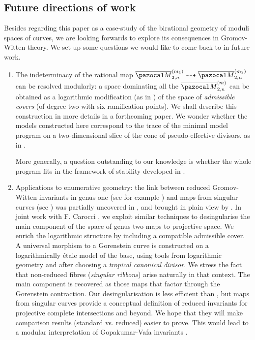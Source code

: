 \documentclass{compositio}
\newcommand{\oM}{\overline{\pazocal M}}
\theoremstyle{plain}
\theoremstyle{definition}
\theoremstyle{remark}
\begin{document}
\subsection{Future directions of work} Besides regarding this paper as a case-study of the birational geometry of moduli spaces of curves, we are looking forwards to explore its consequences in Gromov-Witten theory. We set up some questions we would like to come back to in future work.
\begin{enumerate}[leftmargin=.7cm]
 \item The indeterminacy of the rational map $\oM_{2,n}^{(m_1)}\dashrightarrow\oM_{2,n}^{(m_2)}$ can be resolved modularly: a space dominating all the $\oM_{2,n}^{(m)}$ can be obtained as a logarithmic modification (as in \cite{RSPW1}) of the space of \emph{admissible covers} (of degree two with six ramification points). We shall describe this construction in more details in a forthcoming paper. We wonder whether the models constructed here correspond to the trace of the minimal model program on a two-dimensional slice of the cone of pseudo-effective divisors, as in \cite{SMY2}.
 
 More generally, a question outstanding to our knowledge is whether the whole program fits in the framework of stability developed in \cite{DHLinstability}.
 
 \item Applications to enumerative geometry: the link between reduced Gromov-Witten invariants in genus one (see for example \cite{VZ,Zingerred,LZ}) and maps from singular curves (see \cite{VISC}) was partially uncovered in \cite{BCM}, and brought in plain view by \cite{RSPW1,RSPW2}. In joint work with F. Carocci \cite{BC}, we exploit similar techniques to desingularise the main component of the space of genus two maps to projective space. We enrich the logarithmic structure by including a compatible admissible cover. A universal morphism to a Gorenstein curve is constructed on a logarithmically \'etale model of the base, using tools from logarithmic geometry and after choosing a \emph{tropical canonical divisor}. We stress the fact that non-reduced fibres (\emph{singular ribbons}) arise naturally in that context. The main component is recovered as those maps that factor through the Gorenstein contraction. Our desingularisation is less efficient than \cite{HLN}, but maps from singular curves provide a conceptual definition of reduced invariants for projective complete intersections and beyond. We hope that they will make comparison results (standard vs. reduced) easier to prove. This would lead to a modular interpretation of Gopakumar-Vafa invariants \cite{Pandha}.
\end{enumerate}
\end{document}
